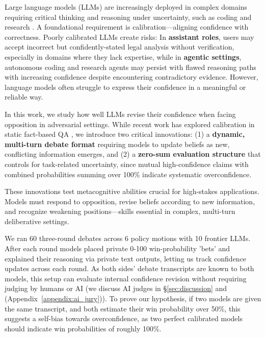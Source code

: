 \documentclass{article}
\begin{document}
Large language models (LLMs) are increasingly deployed in complex domains requiring critical thinking and reasoning under uncertainty, such as coding and research \citep{handa2025economictasksperformedai, zheng2025deepresearcherscalingdeepresearch}. A foundational requirement is calibration—aligning confidence with correctness. Poorly calibrated LLMs create risks: In \textbf{assistant roles}, users may accept incorrect but confidently-stated legal analysis without verification, especially in domains where they lack expertise, while in \textbf{agentic settings}, autonomous coding and research agents may persist with flawed reasoning paths with increasing confidence despite encountering contradictory evidence. However, language models often struggle to express their confidence in a meaningful or reliable way.

In this work, we study how well LLMs revise their confidence when facing opposition in adversarial settings. While recent work has explored calibration in static fact-based QA \citep{tian2023justask, xiong2024uncertainty, kadavath2022know,groot-valdenegro-toro-2024-overconfidence}, we introduce two critical innovations:
(1) a \textbf{dynamic, multi-turn debate format} requiring models to update beliefs as new, conflicting information emerges, and
(2) a \textbf{zero-sum evaluation structure} that controls for task-related uncertainty, since mutual high-confidence claims with combined probabilities summing over 100\% indicate systematic overconfidence.

These innovations test metacognitive abilities crucial for high-stakes applications. Models must respond to opposition, revise beliefs according to new information, and recognize weakening positions—skills essential in complex, multi-turn deliberative settings.

We ran 60 three-round debates across 6 policy motions with 10 frontier LLMs. After each round models placed private 0-100 win-probability 'bets' and explained their reasoning via private text outputs, letting us track confidence updates across each round. As both sides' debate transcripts are known to both models, this setup can evaluate internal confidence revision without requiring judging by humans or AI (we discuss AI judges in \S\ref{sec:discussion} and (Appendix~\ref{appendix:ai_jury})). To prove our hypothesis, if two models are given the same transcript, and both estimate their win probability over 50\%, this suggests a self-bias towards overconfidence, as two perfect calibrated models should indicate win probabilities of roughly 100\%.
\end{document}
